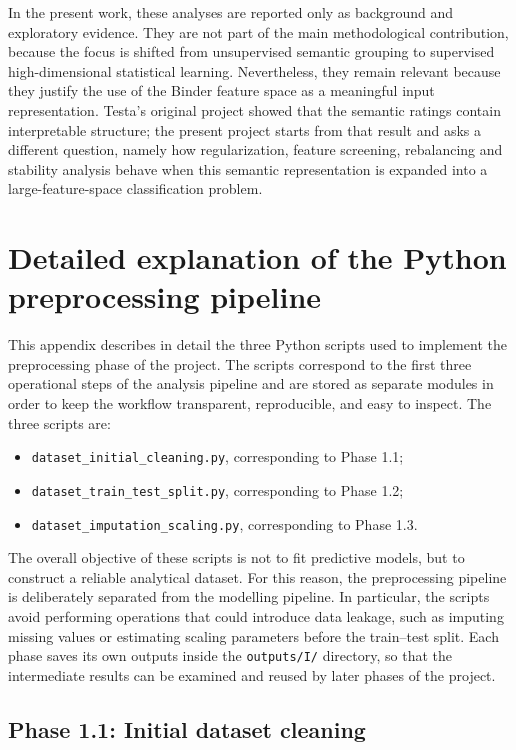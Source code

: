 \documentclass{ipgpmaster}
\begin{document}
In the present work, these analyses are reported only as background and exploratory evidence. They are not part of the main methodological contribution, because the focus is shifted from unsupervised semantic grouping to supervised high-dimensional statistical learning. Nevertheless, they remain relevant because they justify the use of the Binder feature space as a meaningful input representation. Testa's original project showed that the semantic ratings contain interpretable structure; the present project starts from that result and asks a different question, namely how regularization, feature screening, rebalancing and stability analysis behave when this semantic representation is expanded into a large-feature-space classification problem.

\section{Detailed explanation of the Python preprocessing pipeline}

This appendix describes in detail the three Python scripts used to implement the preprocessing phase of the project. The scripts correspond to the first three operational steps of the analysis pipeline and are stored as separate modules in order to keep the workflow transparent, reproducible, and easy to inspect. The three scripts are:

\begin{itemize}
    \item \texttt{dataset\_initial\_cleaning.py}, corresponding to Phase 1.1;
    \item \texttt{dataset\_train\_test\_split.py}, corresponding to Phase 1.2;
    \item \texttt{dataset\_imputation\_scaling.py}, corresponding to Phase 1.3.
\end{itemize}

The overall objective of these scripts is not to fit predictive models, but to construct a reliable analytical dataset. For this reason, the preprocessing pipeline is deliberately separated from the modelling pipeline. In particular, the scripts avoid performing operations that could introduce data leakage, such as imputing missing values or estimating scaling parameters before the train--test split. Each phase saves its own outputs inside the \texttt{outputs/I/} directory, so that the intermediate results can be examined and reused by later phases of the project.

\subsection{Phase 1.1: Initial dataset cleaning}
\end{document}
